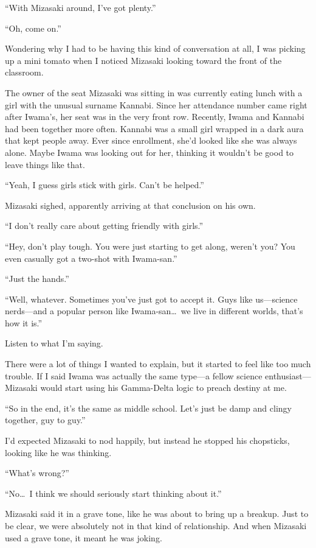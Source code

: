\documentclass[
    a4paper,
    12pt,
    twoside,
    openany,
    UTF8,
    fontset=windows
]{ctexbook}
\begin{document}
``With Mizasaki around, I've got plenty.''

``Oh, come on.''

Wondering why I had to be having this kind of conversation at all, I was picking up a mini tomato when I noticed Mizasaki looking toward the front of the classroom.

The owner of the seat Mizasaki was sitting in was currently eating lunch with a girl with the unusual surname Kannabi. Since her attendance number came right after Iwama's, her seat was in the very front row. Recently, Iwama and Kannabi had been together more often. Kannabi was a small girl wrapped in a dark aura that kept people away. Ever since enrollment, she'd looked like she was always alone. Maybe Iwama was looking out for her, thinking it wouldn't be good to leave things like that.

``Yeah, I guess girls stick with girls. Can't be helped.''

Mizasaki sighed, apparently arriving at that conclusion on his own.

``I don't really care about getting friendly with girls.''

``Hey, don't play tough. You were just starting to get along, weren't you? You even casually got a two-shot with Iwama-san.''

``Just the hands.''

``Well, whatever. Sometimes you've just got to accept it. Guys like us---science nerds---and a popular person like Iwama-san\dots\ we live in different worlds, that's how it is.''

Listen to what I'm saying.

There were a lot of things I wanted to explain, but it started to feel like too much trouble. If I said Iwama was actually the same type---a fellow science enthusiast---Mizasaki would start using his Gamma-Delta logic to preach destiny at me.

``So in the end, it's the same as middle school. Let's just be damp and clingy together, guy to guy.''

I'd expected Mizasaki to nod happily, but instead he stopped his chopsticks, looking like he was thinking.

``What's wrong?''

``No\dots\ I think we should seriously start thinking about it.''

Mizasaki said it in a grave tone, like he was about to bring up a breakup. Just to be clear, we were absolutely not in that kind of relationship. And when Mizasaki used a grave tone, it meant he was joking.
\end{document}
